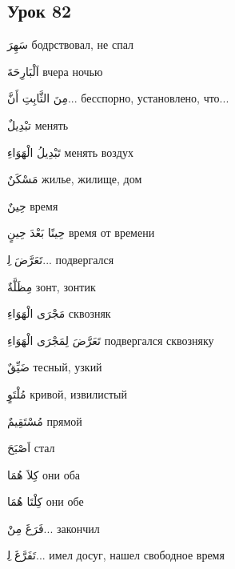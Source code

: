 \documentclass[a5paper]{article}
\newcommand\textstyleDropCaps[1]{#1}
\newcommand\textstyleCaptioncharacters[1]{#1}
\begin{document}
\subsection[Урок 82‎]{\textstyleDropCaps{Урок 82‎}}
\textstyleCaptioncharacters{سَهِرَ }\textstyleDropCaps{бодрствовал, не спал‎}

\textstyleCaptioncharacters{اَلْبَارِحَةَ }\textstyleDropCaps{вчера ночью‎}

\textstyleCaptioncharacters{مِنَ الثَّابِتِ أَنَّ...ِ }\textstyleDropCaps{бесспорно, установлено, что...‎}

\textstyleCaptioncharacters{تبْدِيلٌ }\textstyleDropCaps{менять‎}

\textstyleCaptioncharacters{تَبْدِيلُ الْهَوَاءِ }\textstyleDropCaps{менять воз­дух‎}

\textstyleCaptioncharacters{مَسْكَنٌ }\textstyleDropCaps{жилье, жилище, дом‎}

\textstyleCaptioncharacters{حِينٌ }\textstyleDropCaps{время‎}

\textstyleCaptioncharacters{حِينًا بَعْدَ حِينٍ }\textstyleDropCaps{время от времени‎}

\textstyleCaptioncharacters{تَعَرَّضَ ل‍ِ...ِ }\textstyleDropCaps{подвергался‎}

\textstyleCaptioncharacters{مِظَلَّةٌ }\textstyleDropCaps{зонт, зонтик‎}

\textstyleCaptioncharacters{مَجْرَى الْهَوَاءِ }\textstyleDropCaps{сквозняк‎}

\textstyleCaptioncharacters{تَعَرَّضَ لِمَجْرَى الْهَوَاءِ }\textstyleDropCaps{подвергался сквозняку‎}

\textstyleCaptioncharacters{ضَيِّقٌ }\textstyleDropCaps{тесный, узкий‎}

\textstyleCaptioncharacters{مُلْتَوٍ }\textstyleDropCaps{кривой, извилистый‎}

\textstyleCaptioncharacters{مُسْتَقِيمٌ }\textstyleDropCaps{прямой‎}

\textstyleCaptioncharacters{اَصْبَحَ }\textstyleDropCaps{стал‎}

\textstyleCaptioncharacters{كِلاَ هُمَا }\textstyleDropCaps{они оба‎}

\textstyleCaptioncharacters{كِلْتَا هُمَا }\textstyleDropCaps{они обе‎}

\textstyleCaptioncharacters{فَرَغَ مِنْ...ِ }\textstyleDropCaps{закончил‎}

\textstyleCaptioncharacters{تَفَرَّغَ ل‍ِ...ِ }\textstyleDropCaps{имел досуг, на­шел свободное время‎}
\end{document}
